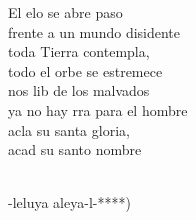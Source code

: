 \begin{cancion}
	El elo se abre paso \\
frente a un mundo disidente\\
	toda  Tierra contempla, \\
todo el orbe se estremece\\
	nos lib de los malvados  \\
	ya no hay rra para el hombre\\
	acla su santa gloria,\\
	 acad su santo nombre\\\jump\\
	\begin{chorus}%
	-leluya aleya-l-*)\\
	\end{chorus}%
	\jump\\
\end{cancion}%
